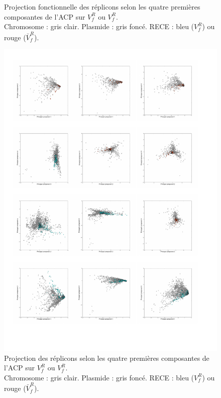 \begin{landscape}
\begin{figure}
\begin{flushleft}
\begin{subfigure}[t]{0.42\textwidth}
	\end{subfigure}
	\caption[Projection fonctionnelle des réplicons selon les quatres composantes principales de l'ACP]{Projection fonctionnelle des réplicons selon les quatre premières composantes de l'ACP sur $V^{R}_{f}$ ou $V^{R}_{f}$.\\
	Chromosome : gris clair. Plasmide : gris foncé. RECE : bleu ($V^{R}_{f}$) ou rouge ($\bar{V}^{R}_{f}$).}
	\end{flushleft}
	\end{figure}
\end{landscape}
  
\fi

\newpage
\thispagestyle{empty}
\begin{figure}[H]
\vspace{-1cm}
\hspace{-2.8cm}
	\begin{minipage}{\textwidth}
	\includegraphics[trim= 0cm 2cm 0cm 0cm,clip, width=1.3\textwidth]{./img/PCA_4comp.pdf}
	\end{minipage}
\caption[Projections des réplicons selon les quatres composantes principales d'une ACP]{Projection des réplicons selon les quatre premières composantes de l'ACP sur $V^{R}_{f}$ ou $V^{R}_{f}$.\\
Chromosome : gris clair. Plasmide : gris foncé. RECE : bleu ($V^{R}_{f}$) ou rouge ($\bar{V}^{R}_{f}$).}\label{figpcascatterplot}
\end{figure}

